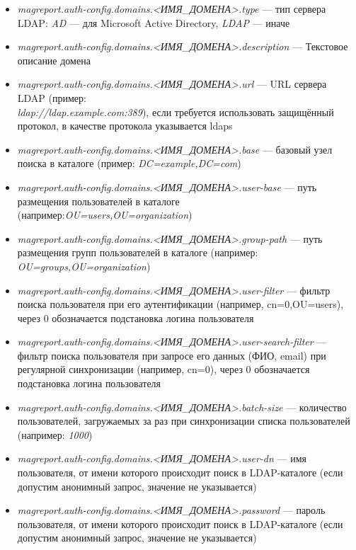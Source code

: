 \documentclass[../user-manual.tex]{subfiles}
\begin{document}
	\begin{itemize}
		
		\item \textit{magreport.auth-config.domains.<ИМЯ\_ДОМЕНА>.type} --- тип сервера LDAP: \textit{AD} --- для Microsoft Active Directory, \textit{LDAP} --- иначе
		
		\item \textit{magreport.auth-config.domains.<ИМЯ\_ДОМЕНА>.description} --- Текстовое описание домена
		
		\item \textit{magreport.auth-config.domains.<ИМЯ\_ДОМЕНА>.url} --- URL сервера LDAP (пример:\\ \textit{ldap://ldap.example.com:389}), если требуется использовать защищённый протокол, в качестве протокола указывается ldaps
		
		\item \textit{magreport.auth-config.domains.<ИМЯ\_ДОМЕНА>.base} --- базовый узел поиска в каталоге (пример: \textit{DC=example,DC=com})
		
		\item \textit{magreport.auth-config.domains.<ИМЯ\_ДОМЕНА>.user-base} --- путь размещения пользователей в каталоге (например:\textit{OU=users,OU=organization})
		
		\item \textit{magreport.auth-config.domains.<ИМЯ\_ДОМЕНА>.group-path} --- путь размещения групп пользователей в каталоге (например:\\ 
		\textit{OU=groups,OU=organization})
		
		\item \textit{magreport.auth-config.domains.<ИМЯ\_ДОМЕНА>.user-filter} --- фильтр поиска пользователя при его аутентификации (например, cn={0},OU=users), через {0} обозначается подстановка логина пользователя
		
		\item \textit{magreport.auth-config.domains.<ИМЯ\_ДОМЕНА>.user-search-filter} --- фильтр поиска пользователя при запросе его данных (ФИО, email) при регулярной синхронизации (например, cn={0}), через {0} обозначается подстановка логина пользователя
		
		\item \textit{magreport.auth-config.domains.<ИМЯ\_ДОМЕНА>.batch-size} --- количество пользователей, загружаемых за раз при синхронизации списка пользователей (например: \textit{1000})
		
		\item \textit{magreport.auth-config.domains.<ИМЯ\_ДОМЕНА>.user-dn} --- имя пользователя, от имени которого происходит поиск в LDAP-каталоге (если допустим анонимный запрос, значение не указывается)
		
		\item \textit{magreport.auth-config.domains.<ИМЯ\_ДОМЕНА>.password} --- пароль пользователя, от имени которого происходит поиск в LDAP-каталоге (если допустим анонимный запрос, значение не указывается)
		
	\end{itemize}
\end{document}
